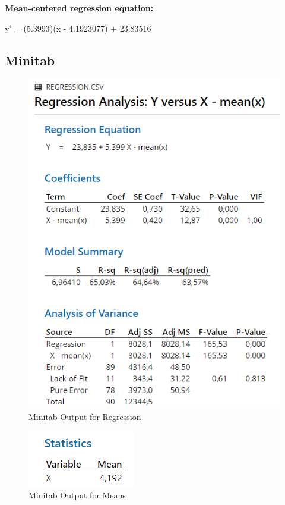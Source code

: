 \documentclass[
]{book}
\begin{document}
\textbf{Mean-centered regression equation:}

y' = (5.3993)(x - 4.1923077) + 23.83516

\hypertarget{minitab-1}{%
\subsection{Minitab}\label{minitab-1}}

\begin{figure}[!h]
\includegraphics{Screenshots/Regression/RegressionMinitab} \caption{\label{fig:RegressionMinitab}Minitab Output for Regression}\label{fig:RegressionMinitab}
\end{figure}

\begin{figure}[!h]
\includegraphics{Screenshots/Regression/RegressionMinitabmeans} \caption{\label{fig:RegressionMinitabmeans}Minitab Output for Means}\label{fig:RegressionMinitabmeans}
\end{figure}
\end{document}
